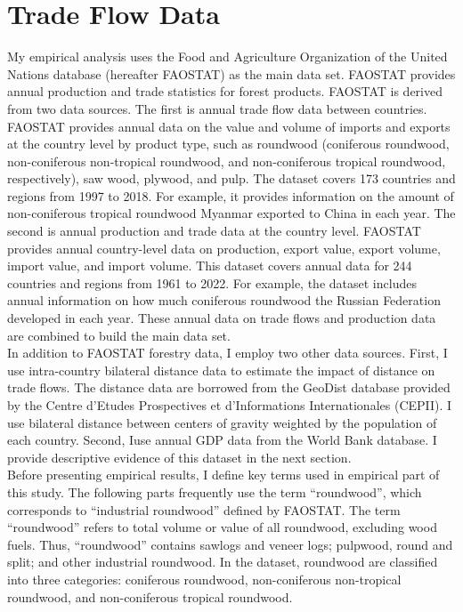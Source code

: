 \documentclass[a4paper,12pt]{article}
\begin{document}
\section{Trade Flow Data}
My empirical analysis uses the Food and Agriculture Organization of the United Nations database (hereafter FAOSTAT) as the main data set. FAOSTAT provides annual production and trade statistics for forest products. FAOSTAT is derived from two data sources. The first is annual trade flow data between countries. FAOSTAT provides annual data on the value and volume of imports and exports at the country level by product type, such as roundwood (coniferous roundwood, non-coniferous non-tropical roundwood, and non-coniferous tropical roundwood, respectively), saw wood, plywood, and pulp. The dataset covers 173 countries and regions from 1997 to 2018. For example, it provides information on the amount of non-coniferous tropical roundwood Myanmar exported to China in each year. The second is annual production and trade data at the country level. FAOSTAT provides annual country-level data on production, export value, export volume, import value, and import volume. This dataset covers annual data for 244 countries and regions from 1961 to 2022. For example, the dataset includes annual information on how much coniferous roundwood the Russian Federation developed in each year. These annual data on trade flows and production data are combined to build the main data set.\\

In addition to FAOSTAT forestry data, I employ two other data sources. First, I use intra-country bilateral distance data to estimate the impact of distance on trade flows. The distance data are borrowed from the GeoDist database provided by the Centre d'Etudes Prospectives et d'Informations Internationales (CEPII). I use bilateral distance between centers of gravity weighted by the population of each country. Second, Iuse annual GDP data from the World Bank database. I provide descriptive evidence of this dataset in the next section.\\

Before presenting empirical results, I define key terms used in empirical part of this study. The following parts frequently use the term ``roundwood'', which corresponds to ``industrial roundwood'' defined by FAOSTAT. The term ``roundwood'' refers to total volume or value of all roundwood, excluding wood fuels. Thus, ``roundwood'' contains sawlogs and veneer logs; pulpwood, round and split; and other industrial roundwood. In the dataset, roundwood are classified into three categories: coniferous roundwood, non-coniferous non-tropical roundwood, and non-coniferous tropical roundwood.
\end{document}
